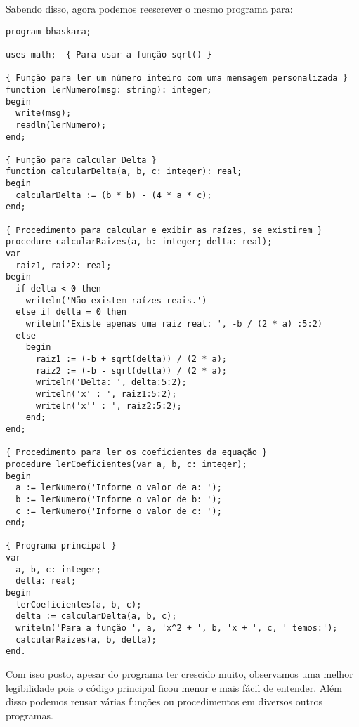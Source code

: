Sabendo disso, agora podemos reescrever o mesmo programa para:
\begin{lstlisting}[]
program bhaskara;

uses math;  { Para usar a função sqrt() }

{ Função para ler um número inteiro com uma mensagem personalizada }
function lerNumero(msg: string): integer;
begin
  write(msg);
  readln(lerNumero);
end;

{ Função para calcular Delta }
function calcularDelta(a, b, c: integer): real;
begin
  calcularDelta := (b * b) - (4 * a * c);
end;

{ Procedimento para calcular e exibir as raízes, se existirem }
procedure calcularRaizes(a, b: integer; delta: real);
var
  raiz1, raiz2: real;
begin
  if delta < 0 then
    writeln('Não existem raízes reais.')
  else if delta = 0 then
    writeln('Existe apenas uma raiz real: ', -b / (2 * a) :5:2)
  else
    begin
      raiz1 := (-b + sqrt(delta)) / (2 * a);
      raiz2 := (-b - sqrt(delta)) / (2 * a);
      writeln('Delta: ', delta:5:2);
      writeln('x' : ', raiz1:5:2);
      writeln('x'' : ', raiz2:5:2);
    end;
end;

{ Procedimento para ler os coeficientes da equação }
procedure lerCoeficientes(var a, b, c: integer);
begin
  a := lerNumero('Informe o valor de a: ');
  b := lerNumero('Informe o valor de b: ');
  c := lerNumero('Informe o valor de c: ');
end;

{ Programa principal }
var
  a, b, c: integer;
  delta: real;
begin
  lerCoeficientes(a, b, c);
  delta := calcularDelta(a, b, c);
  writeln('Para a função ', a, 'x^2 + ', b, 'x + ', c, ' temos:');
  calcularRaizes(a, b, delta);
end.
\end{lstlisting}

Com isso posto, apesar do programa ter crescido muito, observamos uma melhor legibilidade pois o código principal ficou menor e mais fácil de entender. Além disso podemos reusar várias funções ou procedimentos em diversos outros programas.

\clearpage